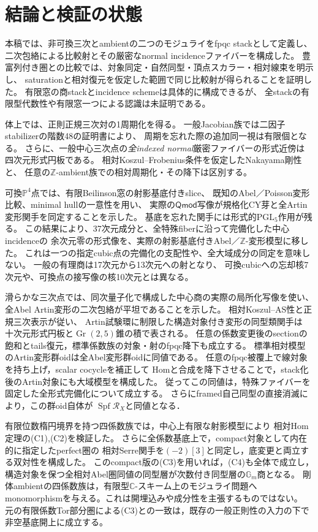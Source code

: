 \documentclass[11pt,a4paper]{ltjsarticle}
\numberwithin{equation}{section}
\newcommand{\C}{\mathbb C}
\newcommand{\PP}{\mathbb P}
\newcommand{\PGL}{\mathrm{PGL}}
\begin{document}
\section{結論と検証の状態}\label{sec:status}
本稿では、非可換三次とambientの二つのモジュライをfpqc stackとして定義し、
二次包絡による比較射とその厳密なnormal incidenceファイバーを構成した。
豊富列付き圏との比較では、対象同定・自然同型・頂点スカラー・相対線束を明示し、
saturationと相対復元を仮定した範囲で同じ比較射が得られることを証明した。
有限窓の商stackとincidence schemeは具体的に構成できるが、
全stackの有限型代数性や有限窓一つによる認識は未証明である。

体上では、正則正規三次対の1周期化を得る。
一般Jacobian族では二因子stabilizerの階数48の証明書により、
周期を忘れた際の追加同一視は有限個となる。
さらに、一般中心三次点の\emph{全indexed normal}厳密ファイバーの形式近傍は
四次元形式円板である。
相対Koszul--Frobenius条件を仮定したNakayama剛性と、
任意の$\mathbb Z$-ambient族での相対周期化・その降下は区別する。

可換$\PP^4$点では、有限Beilinson窓の射影基底付きslice、
既知のAbel／Poisson変形比較、minimal hullの一意性を用い、
実際の$\mathsf{Qmod}$写像が規格化CY芽と全Artin変形関手を同定することを示した。
基底を忘れた関手には形式的$\PGL_5$作用が残る。
この結果により、37次元成分と、全特殊fiberに沿って完備化した中心incidenceの
余次元零の形式像を、実際の射影基底付きAbel／$\mathbb Z$-変形模型に移した。
これは一つの指定cubic点の完備化の支配性や、全大域成分の同定を意味しない。
一般の有理商は17次元から13次元への射となり、
可換cubicへの忘却核7次元や、可換点の接写像の核10次元とは異なる。

滑らかな三次点では、同次量子化で構成した中心商の実際の局所化写像を使い、
全Abel Artin変形の二次包絡が平坦であることを示した。
相対Koszul--AS性と正規三次表示が従い、
Artin試験環に制限した構造対象付き変形の同型類関手は
十次元形式円板と$\operatorname{Gr}(2,5)$錐の積で表される。
任意の係数変更後のsectionの飽和とtails復元，標準係数族の対象・射のfpqc降下も成立する。
標準相対模型のArtin変形群oidは全Abel変形群oidに同値である。
任意のfpqc被覆上で線対象を持ち上げ，scalar cocycleを補正して
Homと合成を降下させることで，stack化後のArtin対象にも大域模型を構成した。
従ってこの同値は，特殊ファイバーを固定した全形式完備化について成立する。
さらにframed自己同型の直接消滅により，この群oid自体が
$\operatorname{Spf}\mathcal R_X$と同値となる．

有限位数楕円境界を持つ四係数族では，中心上有限な射影模型により
相対Hom定理の\textup{(C1),(C2)}を検証した。
さらに全係数基底上で，compact対象として内在的に指定したperfect圏の
相対Serre関手を$(-2)[3]$と同定し，底変更と両立する双対性を構成した。
このcompact版の\textup{(C3)}を用いれば，\textup{(C4)}も全体で成立し，
構造対象を保つ全相対Abel圏同値の同型層が次数付き同型層の$\mathbb G_m$商となる。
剛体ambientの四係数族は，有限型$\C$-スキーム上のモジュライ問題へ
monomorphismを与える。これは開埋込みや成分性を主張するものではない。
元の有限係数Tor部分圏による\textup{(C3)}との一致は，既存の一般正則性の入力の下で
非空基底開上に成立する。
\end{document}
